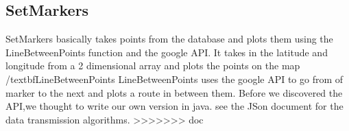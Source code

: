 \documentclass{project}
\begin{document}
\subsection{SetMarkers}
SetMarkers basically takes points from the database and plots them using the LineBetweenPoints function and the google API. It takes in the latitude and longitude from a 2 dimensional array and plots the points on the map
/textbf{LineBetweenPoints}
LineBetweenPoints uses the google API to go from of marker to the next and plots a route in between them. Before we discovered the API,we thought to write our own version in java. 
see the JSon document for the data transmission algorithms.
>>>>>>> doc

\end{document}
